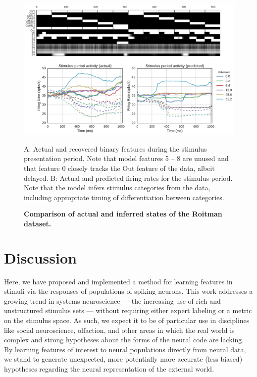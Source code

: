 \documentclass[10pt,letterpaper]{article}
\begin{document}
\begin{figure}[!h]
    \center
    \includegraphics[width=\linewidth]{figures/roitman}
	\caption{\bf Comparison of actual and inferred states of the Roitman dataset.}
	A: Actual and recovered binary features during the stimulus presentation period. Note that model features 5 -- 8 are unused and that feature 0 closely tracks the Out feature of the data, albeit delayed. B: Actual and predicted firing rates for the stimulus period. Note that the model infers stimulus categories from the data, including appropriate timing of differentiation between categories.
	\label{roitman}
\end{figure}


\section*{Discussion}
Here, we have proposed and implemented a method for learning features in stimuli via the responses of populations of spiking neurons. This work addresses a growing trend in systems neuroscience --- the increasing use of rich and unstructured stimulus sets --- without requiring either expert labeling or a metric on the stimulus space. As such, we expect it to be of particular use in disciplines like social neuroscience, olfaction, and other areas in which the real world is complex and strong hypotheses about the forms of the neural code are lacking. By learning features of interest to neural populations directly from neural data, we stand to generate unexpected, more potentially more accurate (less biased) hypotheses regarding the neural representation of the external world.  
\end{document}
